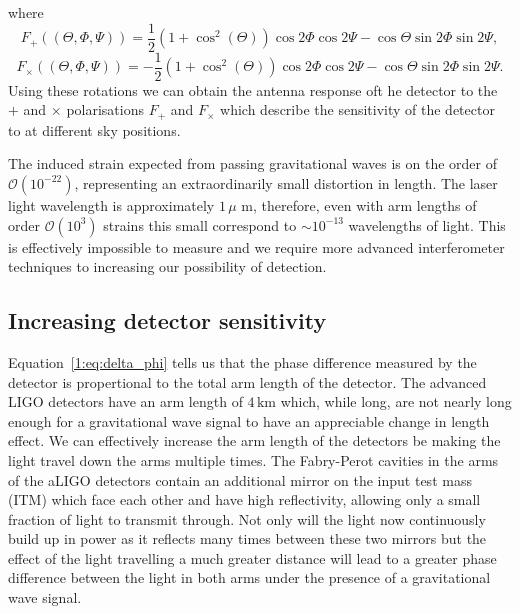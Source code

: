 %
where
%
\begin{equation}
    F_{+}((\Theta, \Phi, \Psi)) = \frac{1}{2}(1 + \cos^{2}(\Theta))\cos2\Phi\cos2\Psi - \cos\Theta\sin2\Phi\sin2\Psi,
\end{equation}
%
\begin{equation}
    F_{\times}((\Theta, \Phi, \Psi)) = -\frac{1}{2}(1 + \cos^{2}(\Theta))\cos2\Phi\cos2\Psi - \cos\Theta\sin2\Phi\sin2\Psi.
\end{equation}
%
Using these rotations we can obtain the antenna response oft he detector to the $+$ and $\times$ polarisations $F_{+}$ and $F_{\times}$ which describe the sensitivity of the detector to \gws at different sky positions. 

The induced strain expected from passing gravitational waves is on the order of $\mathcal{O}(10^{-22})$, representing an extraordinarily small distortion in length. The laser light wavelength is approximately $1 \, \text{$\mu$ m}$, therefore, even with arm lengths of order $\mathcal{O}(10^{3})$ strains this small correspond to ${\sim}10^{-13}$ wavelengths of light. This is effectively impossible to measure and we require more advanced interferometer techniques to increasing our possibility of detection.


\subsection{\label{}Increasing detector sensitivity}

Equation~\ref{1:eq:delta_phi} tells us that the phase difference measured by the detector is propertional to the total arm length of the detector. The advanced LIGO detectors have an arm length of $4 \, \text{km}$ which, while long, are not nearly long enough for a gravitational wave signal to have an appreciable change in length effect. We can effectively increase the arm length of the detectors be making the light travel down the arms multiple times. The Fabry-Perot cavities in the arms of the aLIGO detectors contain an additional mirror on the input test mass (ITM) which face each other and have high reflectivity, allowing only a small fraction of light to transmit through. Not only will the light now continuously build up in power as it reflects many times between these two mirrors but the effect of the light travelling a much greater distance will lead to a greater phase difference between the light in both arms under the presence of a gravitational wave signal.


















